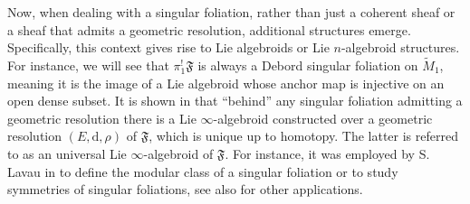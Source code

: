 \documentclass[10pt]{article}
\theoremstyle{plain}
\theoremstyle{definition}
\theoremstyle{remark}
\newcommand{\dd}{\mathrm{d}}
\begin{document}
  
  Now,  when dealing with a singular foliation, rather than just a coherent sheaf or a sheaf that admits a geometric resolution, additional structures emerge. Specifically, this context gives rise to Lie algebroids or Lie $n$-algebroid structures. For instance,
    we will see that $\pi_1^!\mathfrak F$ is  always a Debord singular foliation on $ \widetilde{M}_1$, meaning it is the image of a Lie algebroid whose anchor map is injective on an open dense subset. 
It is shown in \cite{LLS,CLRL} that “behind” any singular foliation admitting a geometric resolution there is a Lie $\infty$-algebroid constructed over a geometric resolution $(E,\dd,\rho)$ of $\mathfrak{F}$, which is unique up to homotopy. The latter is referred to as an universal Lie $\infty$-algebroid of $\mathfrak F$. 
For instance, it was employed by S. Lavau in \cite{SL} to define the modular class of a singular foliation or \cite{RL_symmetries} to study symmetries of singular foliations, see also \cite{CLG-Ryv, Karandeep} for other applications.
\end{document}
